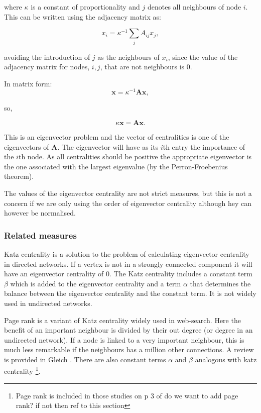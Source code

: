 where $\kappa$ is a constant of proportionality and $j$ denotes all neighbours of node $i$. This can be written using the adjacency matrix as:

\begin{equation}
    x_i = \kappa^{-1} \sum_j A_{ij} x_j,
\end{equation}

avoiding the introduction of $j$ as the neighbours of $x_i$, since the value of the adjacency matrix for nodes, $i,j$, that are not neighbours is 0.

In matrix form:
\begin{equation}
    \mathbf{x}=\kappa^{-1}\mathbf{Ax},
    \end{equation}
    
    so,
    
    \begin{equation}
         \kappa\mathbf{x}=\mathbf{Ax}.
    \end{equation}
  
This is an eigenvector problem and the vector of centralities is one of the eigenvectors of $\mathbf{A}$. The eigenvector will have as its $i$th entry the importance of the $i$th node. As all centralities should be positive the appropriate eigenvector is the one associated with the largest eigenvalue (by the Perron-Froebenius theorem). 
  
   The values of the eigenvector centrality are not strict measures, but this is not a concern if we are only using the order of eigenvector centrality although hey can however be normalised. 
  
 \subsubsection{Related measures}
\label{sec:related centrality measures}
Katz centrality is a solution to the problem of calculating eigenvector centrality in directed networks. If a vertex is not in a strongly connected component it will have an eigenvector centrality of 0. The Katz centrality includes a constant term $\beta$ which is added to the eigenvector centrality and a term $\alpha$ that determines the balance between the eigenvector centrality and the constant term. It is not widely used in undirected networks.\cite{newman2018networks} 

Page rank is a variant of Katz centrality widely used in web-search. Here the benefit of an important neighbour is divided by their out degree (or degree in an undirected network). If a node is linked to a very important neighbour, this is much less remarkable if the neighbours has a million other connections. A review is provided in Gleich \cite{gleich2015pagerank}. There are also constant terms $\alpha$ and $\beta$ analogous with katz centrality\cite{newman2018networks} \footnote{Page rank is included in those studies on p 3 of \cite{kardos2020stability} do we want to add page rank? if not then ref to this section}.
    

